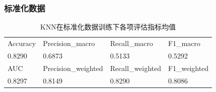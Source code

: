 \documentclass[10pt]{article}
\begin{document}
\subsubsection*{标准化数据}
\begin{table}[H]
  \centering
  \caption{KNN在标准化数据训练下各项评估指标均值}
  \begin{tabular}{llll}
  \toprule
  Accuracy & Precision\_macro & Recall\_macro & F1\_macro \\
  0.8290 & 0.6873 & 0.5133 & 0.5292 \\
  \midrule
  AUC & Precision\_weighted & Recall\_weighted & F1\_weighted \\
  0.8297 & 0.8149 & 0.8290 & 0.8086 \\
  \bottomrule
  \end{tabular}
\end{table}
\end{document}
